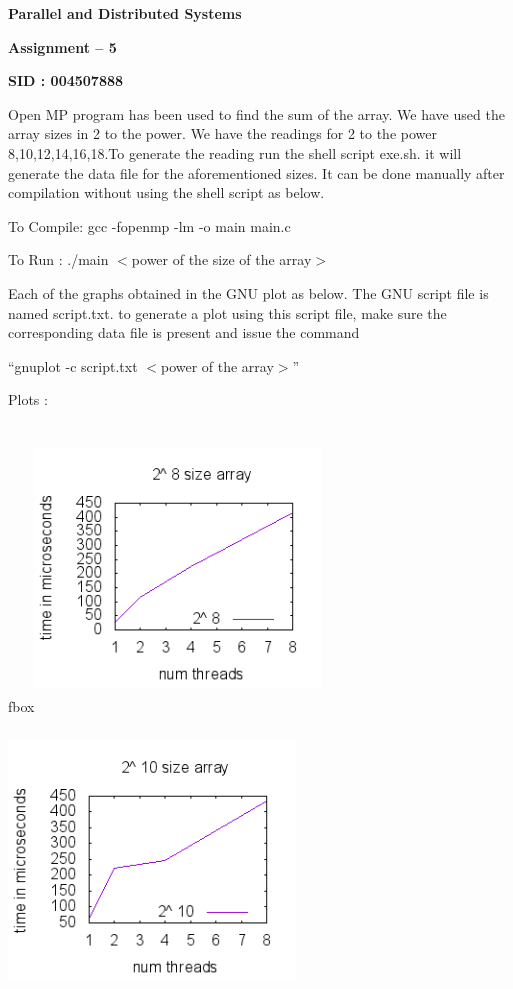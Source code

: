 \documentclass{article} %
\begin{document}


\noindent \textbf{Parallel and Distributed Systems}

\noindent \textbf{Assignment -- 5}

\noindent \textbf{SID : 004507888}

\noindent \textbf{}

\noindent Open MP program has been used to find the sum of the array. We have used the array sizes in 2 to the power. We have the readings for 2 to the power 8,10,12,14,16,18.To generate the reading run the shell script exe.sh. it will generate the data file for the aforementioned sizes. It can be done manually after compilation without using the shell script as below.

\noindent To Compile: gcc -fopenmp -lm -o main main.c

\noindent To Run       : ./main $<$power of the size of the array$>$ 

\noindent Each of the graphs obtained in the GNU plot as below. The GNU script file is named script.txt. to generate a plot using this script file, make sure the corresponding data file is present and issue the command 

\noindent ``gnuplot -c script.txt $<$power of the array$>$''

\noindent 

\noindent Plots :

fbox{\noindent \includegraphics*[scale = 0.5, bb=0 0 3in 3in, width=3in, height=3in, keepaspectratio=true]{out8.png}\includegraphics*[scale = 0.5, bb=0 0 3in 3in, width=3in, height=3in, keepaspectratio=true]{out10.png}}
\end{document}
